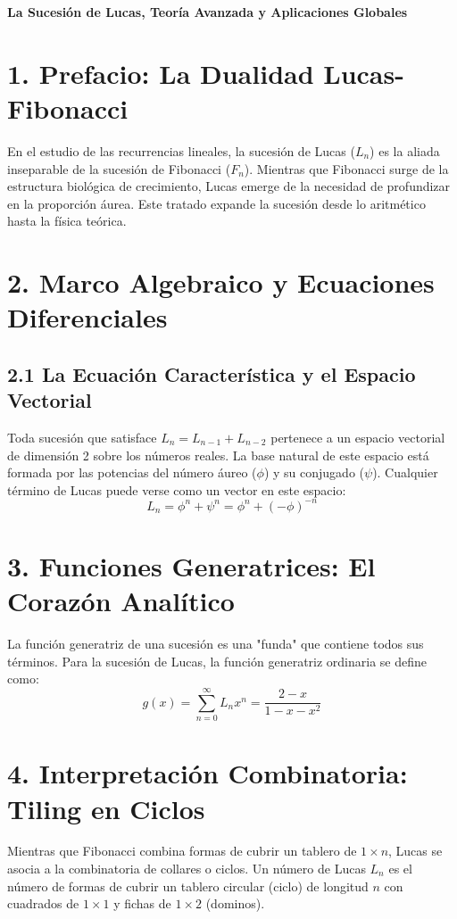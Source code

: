 \documentclass[11pt]{article}
\begin{document}
\begin{center}
    \begin{tcolorbox}[colback=tituloPrincipal, colframe=tituloPrincipal, arc=3pt, center title, inner topsep=10pt, inner bottomsep=10pt]
        \color{white} \LARGE \textbf{La Sucesión de Lucas, Teoría Avanzada y Aplicaciones Globales }
    \end{tcolorbox}
\end{center}

\section*{1. Prefacio: La Dualidad Lucas-Fibonacci}
En el estudio de las recurrencias lineales, la sucesión de Lucas ($L_n$) es la aliada inseparable de la sucesión de Fibonacci ($F_n$). Mientras que Fibonacci surge de la estructura biológica de crecimiento, Lucas emerge de la necesidad de profundizar en la proporción áurea. Este tratado expande la sucesión desde lo aritmético hasta la física teórica.

\section*{2. Marco Algebraico y Ecuaciones Diferenciales}
\subsection*{2.1 La Ecuación Característica y el Espacio Vectorial}
Toda sucesión que satisface $L_n = L_{n-1} + L_{n-2}$ pertenece a un espacio vectorial de dimensión 2 sobre los números reales. La base natural de este espacio está formada por las potencias del número áureo ($\phi$) y su conjugado ($\psi$). Cualquier término de Lucas puede verse como un vector en este espacio:
{\color{colorFormula}
\[ L_n = \phi^n + \psi^n = \phi^n + (-\phi)^{-n} \]}

\section*{3. Funciones Generatrices: El Corazón Analítico}
La función generatriz de una sucesión es una "funda" que contiene todos sus términos. Para la sucesión de Lucas, la función generatriz ordinaria se define como:
{\color{colorFormula}
\[ g(x) = \sum_{n=0}^{\infty} L_n x^n = \frac{2-x}{1-x-x^2} \]}

\section*{4. Interpretación Combinatoria: Tiling en Ciclos}
Mientras que Fibonacci combina formas de cubrir un tablero de $1 \times n$, Lucas se asocia a la combinatoria de collares o ciclos. Un número de Lucas $L_n$ es el número de formas de cubrir un tablero circular (ciclo) de longitud $n$ con cuadrados de $1 \times 1$ y fichas de $1 \times 2$ (dominos).
\end{document}
